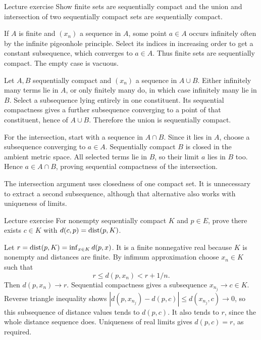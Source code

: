 \begin{exam}{Lecture exercise}
Show finite sets are sequentially compact and the union and intersection of two sequentially compact sets are sequentially compact.
\end{exam}
\begin{answer}
If $A$ is finite and $(x_n)$ a sequence in $A$, some point $a\in A$ occurs infinitely often by the infinite pigeonhole principle. Select its indices in increasing order to get a constant subsequence, which converges to $a\in A$. Thus finite sets are sequentially compact. The empty case is vacuous.

Let $A,B$ sequentially compact and $(x_n)$ a sequence in $A\cup B$. Either infinitely many terms lie in $A$, or only finitely many do, in which case infinitely many lie in $B$. Select a subsequence lying entirely in one constituent. Its sequential compactness gives a further subsequence converging to a point of that constituent, hence of $A\cup B$. Therefore the union is sequentially compact.

For the intersection, start with a sequence in $A\cap B$. Since it lies in $A$, choose a subsequence converging to $a\in A$. Sequentially compact $B$ is closed in the ambient metric space. All selected terms lie in $B$, so their limit $a$ lies in $B$ too. Hence $a\in A\cap B$, proving sequential compactness of the intersection.
\end{answer}
\begin{tip}
The intersection argument uses closedness of one compact set. It is unnecessary to extract a second subsequence, although that alternative also works with uniqueness of limits.
\end{tip}
\begin{exam}{Lecture exercise}
For nonempty sequentially compact $K$ and $p\in E$, prove there exists $c\in K$ with $d(c,p)=\operatorname{dist}(p,K)$.
\end{exam}
\begin{answer}
Let $r=\operatorname{dist}(p,K)=\inf_{x\in K}d(p,x)$. It is a finite nonnegative real because $K$ is nonempty and distances are finite. By infimum approximation choose $x_n\in K$ such that
\[r\le d(p,x_n)<r+1/n.\]
Then $d(p,x_n)\to r$. Sequential compactness gives a subsequence $x_{n_j}\to c\in K$. Reverse triangle inequality shows $|d(p,x_{n_j})-d(p,c)|\le d(x_{n_j},c)\to0$, so this subsequence of distance values tends to $d(p,c)$. It also tends to $r$, since the whole distance sequence does. Uniqueness of real limits gives $d(p,c)=r$, as required.
\end{answer}

